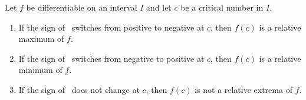 %
{Let $f$ be differentiable on an interval $I$ and let $c$ be a critical number in $I$.
\begin{enumerate}
\item		If the sign of \fp\ switches from positive to negative at $c$, then $f(c)$ is a relative maximum of $f$.
\item		If the sign of \fp\ switches from negative to positive at $c$, then $f(c)$ is a relative minimum of $f$.
\item		If the sign of \fp\ does not change at $c$, then $f(c)$ is not a relative extrema of $f$.
\end{enumerate}
}
\normalsize
\restoreboxwidth

